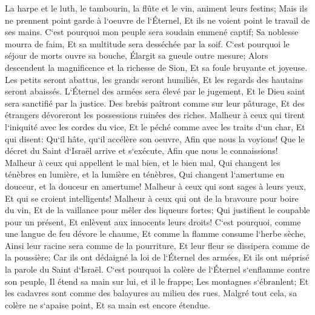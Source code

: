 \verse La harpe et le luth, le tambourin, la flûte et le vin, animent leurs festins; Mais ils ne prennent point garde à l`oeuvre de l`Éternel, Et ils ne voient point le travail de ses mains. 
\verse C`est pourquoi mon peuple sera soudain emmené captif; Sa noblesse mourra de faim, Et sa multitude sera desséchée par la soif. 
\verse C`est pourquoi le séjour de morts ouvre sa bouche, Élargit sa gueule outre mesure; Alors descendent la magnificence et la richesse de Sion, Et sa foule bruyante et joyeuse. 
\verse Les petits seront abattus, les grands seront humiliés, Et les regards des hautains seront abaissés. 
\verse L`Éternel des armées sera élevé par le jugement, Et le Dieu saint sera sanctifié par la justice. 
\verse Des brebis paîtront comme sur leur pâturage, Et des étrangers dévoreront les possessions ruinées des riches. 
\verse Malheur à ceux qui tirent l`iniquité avec les cordes du vice, Et le péché comme avec les traits d`un char, 
\verse Et qui disent: Qu`il hâte, qu`il accélère son oeuvre, Afin que nous la voyions! Que le décret du Saint d`Israël arrive et s`exécute, Afin que nous le connaissions! 
\verse Malheur à ceux qui appellent le mal bien, et le bien mal, Qui changent les ténèbres en lumière, et la lumière en ténèbres, Qui changent l`amertume en douceur, et la douceur en amertume! 
\verse Malheur à ceux qui sont sages à leurs yeux, Et qui se croient intelligents! 
\verse Malheur à ceux qui ont de la bravoure pour boire du vin, Et de la vaillance pour mêler des liqueurs fortes; 
\verse Qui justifient le coupable pour un présent, Et enlèvent aux innocents leurs droits! 
\verse C`est pourquoi, comme une langue de feu dévore le chaume, Et comme la flamme consume l`herbe sèche, Ainsi leur racine sera comme de la pourriture, Et leur fleur se dissipera comme de la poussière; Car ils ont dédaigné la loi de l`Éternel des armées, Et ils ont méprisé la parole du Saint d`Israël. 
\verse C`est pourquoi la colère de l`Éternel s`enflamme contre son peuple, Il étend sa main sur lui, et il le frappe; Les montagnes s`ébranlent; Et les cadavres sont comme des balayures au milieu des rues. Malgré tout cela, sa colère ne s`apaise point, Et sa main est encore étendue. 
